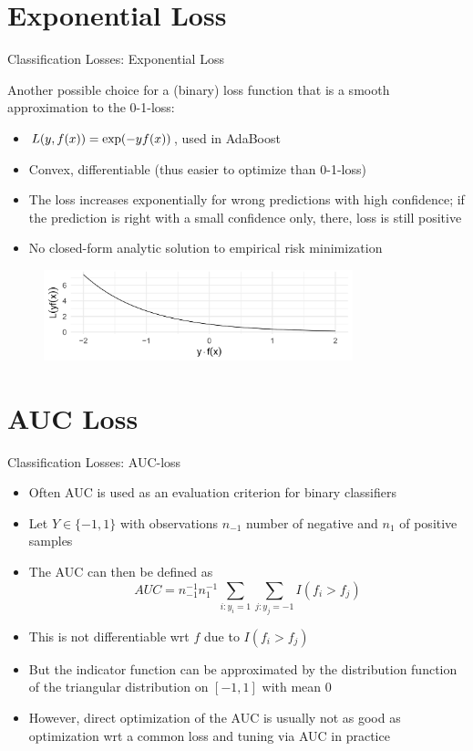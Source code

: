 \section{Exponential Loss}

\begin{vbframe}{Classification Losses: Exponential Loss}

Another possible choice for a (binary) loss function that is a smooth approximation to the 0-1-loss:
\begin{itemize}
\item $L(y, f(x)) = \exp(-yf(x))$, used in AdaBoost
\item Convex, differentiable (thus easier to optimize than 0-1-loss)
\item The loss increases exponentially for wrong predictions with high confidence; if the prediction is right with a small confidence only, there, loss is still positive
\item No closed-form analytic solution to empirical risk minimization
\end{itemize}


\begin{figure}
\includegraphics[width = 0.8\textwidth]{figure_man/exponential-loss.png}
\end{figure}


\end{vbframe}


\section{AUC Loss}


\begin{vbframe}{Classification Losses: AUC-loss}

\begin{itemize}
\item Often AUC is used as an evaluation criterion for binary classifiers
\item Let $Y \in \{-1, 1\}$ with observations $n_{-1}$ number of negative and $n_{1}$ of positive samples %
\item The AUC can then be defined as
$$AUC = n_{-1}^{-1} n_1^{-1} \sum_{i: y_i = 1} \sum_{j: y_j = -1} I(f_i > f_j)$$
\item This is not differentiable wrt $f$ due to $I(f_i > f_j)$
\item But the indicator function can be approximated by the distribution function of the triangular distribution on $[-1, 1]$ with mean $0$
\item However, direct optimization of the AUC is usually not as good as optimization wrt a common loss and tuning via AUC in practice 

\end{itemize}
\end{vbframe}





